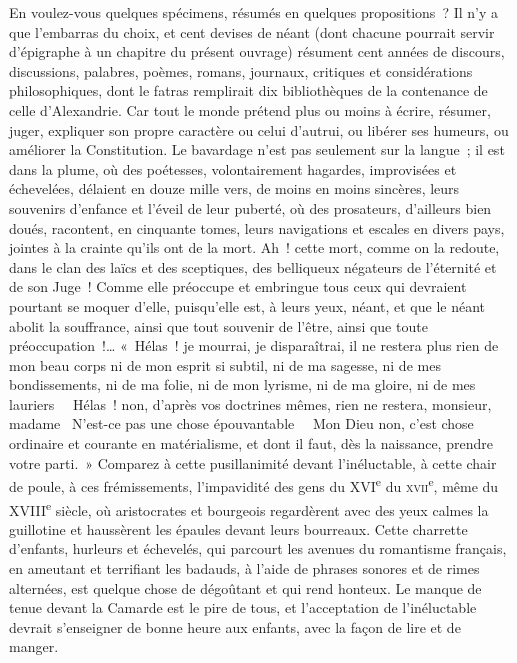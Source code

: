 \documentclass[french,twoside]{book} %
\begin{document}
En voulez-vous quelques spécimens, résumés en quelques propositions ? Il n’y a que l’embarras du choix, et cent devises de néant (dont chacune pourrait servir d’épigraphe à un chapitre du présent ouvrage) résument cent années de discours, discussions, palabres, poèmes, romans, journaux, critiques et considérations philosophiques, dont le fatras remplirait dix bibliothèques de la contenance de celle d’Alexandrie. Car tout le monde prétend plus ou moins à écrire, résumer, juger, expliquer son propre caractère ou celui d’autrui, ou libérer ses humeurs, ou améliorer la Constitution. Le bavardage n’est pas seulement sur la langue ; il est dans la plume, où des poétesses, volontairement hagardes, improvisées et échevelées, délaient en douze mille vers, de moins en moins sincères, leurs souvenirs d’enfance et l’éveil de leur puberté, où des prosateurs, d’ailleurs bien doués, racontent, en cinquante tomes, leurs navigations et escales en divers pays, jointes à la crainte qu’ils ont de la mort. Ah ! cette mort, comme on la redoute, dans le clan des laïcs et des sceptiques, des belliqueux négateurs de l’éternité et de son Juge ! Comme elle préoccupe et embringue tous ceux qui devraient pourtant se moquer d’elle, puisqu’elle est, à leurs yeux, néant, et que le néant abolit la souffrance, ainsi que tout souvenir de l’être, ainsi que toute préoccupation !… « Hélas ! je mourrai, je disparaîtrai, il ne restera plus rien de mon beau corps ni de mon esprit si subtil, ni de ma sagesse, ni de mes bondissements, ni de ma folie, ni de mon lyrisme, ni de ma gloire, ni de mes lauriers   Hélas ! non, d’après vos doctrines mêmes, rien ne restera, monsieur, madame  N’est-ce pas une chose épouvantable   Mon Dieu non, c’est chose ordinaire et courante en matérialisme, et dont il faut, dès la naissance, prendre votre parti. » Comparez à cette pusillanimité devant l’inéluctable, à cette chair de poule, à ces frémissements, l’impavidité des gens du XVI\textsuperscript{e} du \textsc{xvii}\textsuperscript{e}, même du XVIII\textsuperscript{e} siècle, où aristocrates et bourgeois regardèrent avec des yeux calmes la guillotine et haussèrent les épaules devant leurs bourreaux. Cette charrette d’enfants, hurleurs et échevelés, qui parcourt les avenues du romantisme français, en ameutant et terrifiant les badauds, à l’aide de phrases sonores et de rimes alternées, est quelque chose de dégoûtant et qui rend honteux. Le manque de tenue devant la Camarde est le pire de tous, et l’acceptation de l’inéluctable devrait s’enseigner de bonne heure aux enfants, avec la façon de lire et de manger.\par
\end{document}
